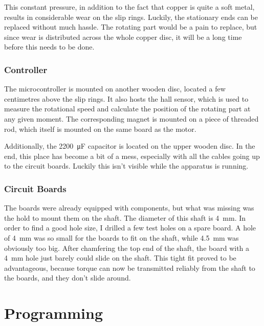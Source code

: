 \documentclass[a4paper, 11pt, titlepage]{report}
\begin{document}
This constant pressure, in addition to the fact that copper is quite a soft metal, results in
considerable wear on the slip rings. Luckily, the stationary ends can be replaced without much
hassle. The rotating part would be a pain to replace, but since wear is distributed across the
whole copper disc, it will be a long time before this needs to be done.


\subsection{Controller}

The microcontroller is mounted on another wooden disc, located a few centimetres above the slip
rings. It also hosts the hall sensor, which is used to measure the rotational speed and calculate
the position of the rotating part at any given moment. The corresponding magnet is mounted on a
piece of threaded rod, which itself is mounted on the same board as the motor.

Additionally, the \SI{2200}{\micro\farad} capacitor is located on the upper wooden disc. In the
end, this place has become a bit of a mess, especially with all the cables going up to the circuit
boards. Luckily this isn't visible while the apparatus is running.


\subsection{Circuit Boards}

The boards were already equipped with components, but what was missing was the hold to mount them
on the shaft. The diameter of this shaft is \SI{4}{\milli\meter}. In order to find a good hole
size, I drilled a few test holes on a spare board. A hole of \SI{4}{\milli\meter} was so small for
the boards to fit on the shaft, while \SI{4.5}{\milli\meter} was obviously too big. After
chamfering the top end of the shaft, the board with a \SI{4}{\milli\meter} hole just barely could
slide on the shaft. This tight fit proved to be advantageous, because torque can now be transmitted
reliably from the shaft to the boards, and they don't slide around.


\chapter{Programming}
\end{document}
